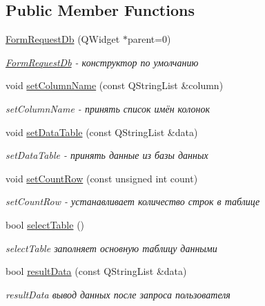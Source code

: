 \subsection*{Public Member Functions}
\begin{DoxyCompactItemize}
\item 
\hyperlink{classFormRequestDb_a073afd7a2f960c039e3a30e823123939}{Form\+Request\+Db} (Q\+Widget $\ast$parent=0)
\begin{DoxyCompactList}\small\item\em \hyperlink{classFormRequestDb}{Form\+Request\+Db} -\/ конструктор по умолчанию \end{DoxyCompactList}\item 
void \hyperlink{classFormRequestDb_a383d0f163ad200d2438e1549df626c4e}{set\+Column\+Name} (const Q\+String\+List \&column)
\begin{DoxyCompactList}\small\item\em set\+Column\+Name -\/ принять список имён колонок \end{DoxyCompactList}\item 
void \hyperlink{classFormRequestDb_a6344496d9d92e92078dacf8218cae768}{set\+Data\+Table} (const Q\+String\+List \&data)
\begin{DoxyCompactList}\small\item\em set\+Data\+Table -\/ принять данные из базы данных \end{DoxyCompactList}\item 
void \hyperlink{classFormRequestDb_ae6ec41ba642b5b9351d5d5077ffb97e5}{set\+Count\+Row} (const unsigned int count)
\begin{DoxyCompactList}\small\item\em set\+Count\+Row -\/ устанавливает количество строк в таблице \end{DoxyCompactList}\item 
bool \hyperlink{classFormRequestDb_af37eecece828d15fe8a0f2025bba6d6c}{select\+Table} ()
\begin{DoxyCompactList}\small\item\em select\+Table заполняет основную таблицу данными \end{DoxyCompactList}\item 
bool \hyperlink{classFormRequestDb_a9752fbc1286338cf3fe1a9fee28ac4a7}{result\+Data} (const Q\+String\+List \&data)
\begin{DoxyCompactList}\small\item\em result\+Data вывод данных после запроса пользователя \end{DoxyCompactList}\item 

\end{DoxyCompactItemize}
